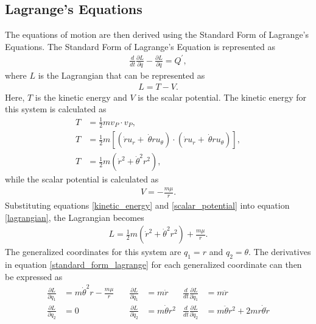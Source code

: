 \documentclass[]{article}
\begin{document}
\subsection{Lagrange's Equations}
The equations of motion are then derived using the Standard Form of Lagrange's Equations. The Standard Form of Lagrange's Equation is represented as
\begin{align}
	\frac{d}{dt}\frac{\partial L}{\partial \dot{q}} - \frac{\partial L}{\partial q} = Q^{'}, \label{standard_form_lagrange}
\end{align}
where \(L\) is the Lagrangian that can be represented as
\begin{align}
	L = T - V. \label{lagrangian}
\end{align}
Here, \(T\) is the kinetic energy and \(V\) is the scalar potential. The kinetic energy for this system is calculated as 
\begin{align}
	T &= \frac{1}{2}mv_{P} \cdot v_{P}, \nonumber\\
	T &= \frac{1}{2}m[(\dot{r}u_{r} +\ \dot{\theta}ru_{\theta}) \cdot (\dot{r}u_{r} +\ \dot{\theta}ru_{\theta})], \nonumber\\
	T &= \frac{1}{2}m(\dot{r}^2+\dot{\theta}^2r^2), \label{kinetic_energy}
\end{align}
while the scalar potential is calculated as
\begin{align}
	V = -\frac{m\mu}{r}. \label{scalar_potential}
\end{align}
Substituting equations \ref{kinetic_energy} and \ref{scalar_potential} into equation \ref{lagrangian}, the Lagrangian becomes
\begin{align}
	L = \frac{1}{2}m(\dot{r}^2+\dot{\theta}^2r^2) + \frac{m\mu}{r}. \label{lagrangian2}
\end{align}
 The generalized coordinates for this system are \(q_1 = r\) and \(q_2 = \theta\). The derivatives in equation \ref{standard_form_lagrange} for each generalized coordinate can then be expressed as
\begin{align*}
  \frac{\partial L}{\partial q_{1}} &= m\dot{\theta}^2r - \frac{m\mu}{r}\quad & \frac{\partial L}{\partial \dot{q}_{1}} &= m\dot{r}          & \frac{d}{dt}\frac{\partial L}{\partial \dot{q}_{1}} &= m\ddot{r} \\
  \frac{\partial L}{\partial q_{2}} &= 0\quad                                 & \frac{\partial L}{\partial \dot{q}_{2}} &= m\dot{\theta}r^2  & \frac{d}{dt}\frac{\partial L}{\partial \dot{q}_{2}} &= m\ddot{\theta}r^2 + 2mr\dot{\theta}\dot{r}
\end{align*}
\end{document}
